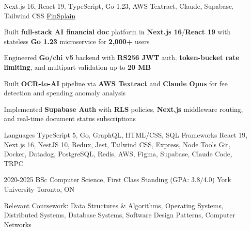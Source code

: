 \documentclass[11pt, a4paper]{awesome-cv}
\begin{document}

\begin{cventries}
  \cventry
  {Next.js 16, React 19, TypeScript, Go 1.23, AWS Textract, Claude, Supabase, Tailwind CSS}
  {\href{https://finsplain.net}{\textcolor{black}{\underline{FinSplain}} \faExternalLink}}
  {}
  {}
  {
    \begin{cvitems}
      \item {Built \textbf{full-stack AI financial doc} platform in \textbf{Next.js 16}/\textbf{React 19} with stateless \textbf{Go 1.23} microservice for \textbf{2,000+} users}
      \item {Engineered \textbf{Go/chi v5} backend with \textbf{RS256 JWT} auth, \textbf{token-bucket rate limiting}, and multipart validation up to \textbf{20 MB}}
      \item {Built \textbf{OCR-to-AI} pipeline via \textbf{AWS Textract} and \textbf{Claude Opus} for fee detection and spending anomaly analysis}
      \item {Implemented \textbf{Supabase Auth} with \textbf{RLS} policies, \textbf{Next.js} middleware routing, and real-time document status subscriptions}
    \end{cvitems}
  }
\end{cventries}


\begin{cvskills}
  \cvskill
  {Languages}
  {TypeScript 5, Go, GraphQL, HTML/CSS, SQL}
  \cvskill
  {Frameworks}
  {React 19, Next.js 16, NestJS 10, Redux, Jest, Tailwind CSS, Express, Node}
  \cvskill
  {Tools}
  {Git, Docker, Datadog, PostgreSQL, Redis, AWS, Figma, Supabase, Claude Code, TRPC}
\end{cvskills}

\vspace{-2mm}

\begin{cventries}
  \cventry
  {2020-2025}
  {BSc Computer Science, First Class Standing (GPA: 3.8/4.0)}
  {York University}
  {Toronto, ON}
  {%
    \begin{cvitems}
      \item {Relevant Coursework: Data Structures \& Algorithms, Operating Systems, Distributed Systems, Database Systems, Software Design Patterns, Computer Networks}
    \end{cvitems}
    \vspace{-4mm}
  }
\end{cventries}
\end{document}
